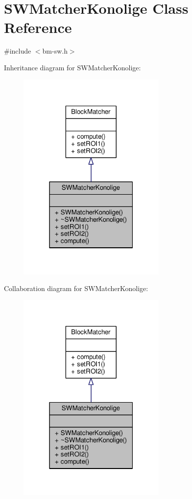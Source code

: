 \hypertarget{classSWMatcherKonolige}{}\section{S\+W\+Matcher\+Konolige Class Reference}
\label{classSWMatcherKonolige}


{\ttfamily \#include $<$bm-\/sw.\+h$>$}



Inheritance diagram for S\+W\+Matcher\+Konolige\+:
\nopagebreak
\begin{figure}[H]
\begin{center}
\leavevmode
\includegraphics[width=207pt]{classSWMatcherKonolige__inherit__graph}
\end{center}
\end{figure}


Collaboration diagram for S\+W\+Matcher\+Konolige\+:
\nopagebreak
\begin{figure}[H]
\begin{center}
\leavevmode
\includegraphics[width=207pt]{classSWMatcherKonolige__coll__graph}
\end{center}
\end{figure}
